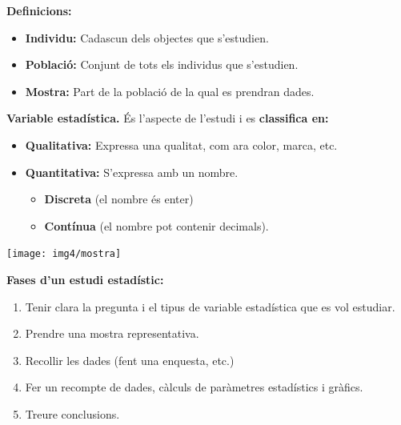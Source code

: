 \begin{theorybox}
 \textbf{Definicions:}

\begin{minipage}{0.7\textwidth}
		\begin{itemize}
	\item \textbf{      Individu: }Cadascun dels objectes que s'estudien.
	
	\item \textbf{      Població: }Conjunt de tots els individus que s'estudien.
	
	\item \textbf{      Mostra:} Part de la població de la qual es prendran dades.
	\end{itemize}

\vspace{0.25cm}

	 \textbf{Variable estadística. }És l'aspecte de l'estudi i es\textbf{ classifica en:}
	\begin{itemize}
		\item \textbf{       Qualitativa:} Expressa una qualitat, com ara color, marca, etc.
		\item \textbf{        Quantitativa: }S'expressa amb un nombre.  
		\begin{itemize}
			\item \textbf{Discreta} (el nombre és enter) 
			\item \textbf{Contínua} (el  nombre pot contenir decimals).
		\end{itemize}
	\end{itemize}
\end{minipage}
\begin{minipage}{0.3\textwidth}
	\centering
	\texttt{[image: img4/mostra]}
\end{minipage}




 \textbf{Fases d'un estudi estadístic:}
\begin{enumerate} 
	\item  Tenir clara la pregunta i el tipus de variable estadística que es vol estudiar.  
	\item Prendre una mostra representativa.
	\item Recollir les dades (fent una enquesta, etc.) 
	\item  Fer un recompte de dades, càlculs de paràmetres estadístics i gràfics.
	\item Treure conclusions.
\end{enumerate} 
\end{theorybox}

